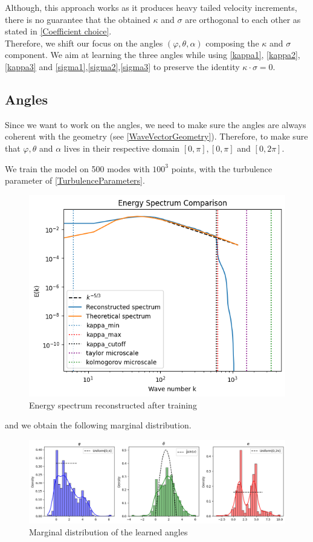 \documentclass[a4paper,12pt]{article}
\theoremstyle{definition}
\begin{document}
Although, this approach works as it produces heavy tailed velocity increments, there is no guarantee that the obtained $\kappa$ and $\sigma$ are orthogonal to each other as stated in \ref{Coefficient choice}. \\
Therefore, we shift our focus on the angles $(\varphi,\theta,\alpha)$ composing the $\kappa$ and $\sigma$ component. We aim at learning the three angles while using \ref{kappa1}, \ref{kappa2},\ref{kappa3} and \ref{sigma1},\ref{sigma2},\ref{sigma3} to preserve the identity $\kappa\cdot\sigma=0$.


\subsection{Angles}
Since we want to work on the angles, we need to make sure the angles are always coherent with the geometry (see \ref{WaveVectorGeometry}). Therefore, to make sure that $\varphi, \theta$ and $\alpha$ lives in their respective domain $[0,\pi], [0,\pi]$ and $[0,2\pi]$.

We train the model on 500 modes with $100^3$ points, with the turbulence parameter of \ref{TurbulenceParameters}.

\begin{figure}[H]
    \centering
    \includegraphics[width=0.7\linewidth]{illustrations/EnergySpectrumTrained.png}
    \caption{Energy spectrum reconstructed after training}
\end{figure}

and we obtain the following marginal distribution.
\begin{figure}[H]
    \centering 
    \includegraphics[width=1.0\linewidth]{illustrations/AnglesDistributionLearned.png}
    \caption{Marginal distribution of the learned angles}
\end{figure}
\end{document}

